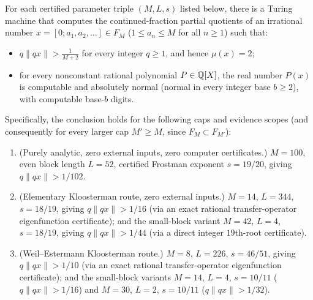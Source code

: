 \documentclass[11pt]{article}
\newcommand{\dist}[1]{\lVert #1\rVert}
\begin{document}
\begin{maintheorem}\label{thm:A}
For each certified parameter triple $(M,L,s)$ listed below, there is a Turing machine that computes the continued-fraction partial quotients of an irrational number $x=[0;a_1,a_2,\dots]\in F_M$ ($1\le a_n\le M$ for all $n\ge1$) such that:
\begin{itemize}[nosep]
\item $q\dist{qx}>\frac{1}{M+2}$ for every integer $q\ge1$, and hence $\mu(x)=2$;
\item for every nonconstant rational polynomial $P\in\mathbb Q[X]$, the real number $P(x)$ is computable and absolutely normal (normal in every integer base $b\ge2$), with computable base-$b$ digits.
\end{itemize}
Specifically, the conclusion holds for the following caps and evidence scopes (and consequently for every larger cap $M'\ge M$, since $F_M\subset F_{M'}$):
\begin{enumerate}[label=\textup{(\roman*)},nosep]
\item {} \textup{(Purely analytic, zero external inputs, zero computer certificates.)} $M=100$, even block length $L=52$, certified Frostman exponent $s=19/20$, giving $q\dist{qx}>1/102$.
\item {} \textup{(Elementary Kloosterman route, zero external inputs.)} $M=14$, $L=344$, $s=18/19$, giving $q\dist{qx}>1/16$ (via an exact rational transfer-operator eigenfunction certificate); and the small-block variant $M=42$, $L=4$, $s=18/19$, giving $q\dist{qx}>1/44$ (via a direct integer $19$th-root certificate).
\item {} \textup{(Weil--Estermann Kloosterman route.)} $M=8$, $L=226$, $s=46/51$, giving $q\dist{qx}>1/10$ (via an exact rational transfer-operator eigenfunction certificate); and the small-block variants $M=14$, $L=4$, $s=10/11$ ($q\dist{qx}>1/16$) and $M=30$, $L=2$, $s=10/11$ ($q\dist{qx}>1/32$).
\end{enumerate}
\end{maintheorem}
\end{document}
